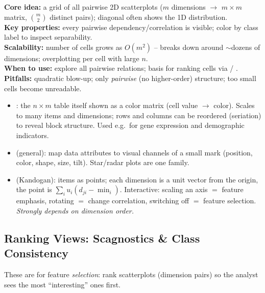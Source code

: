 \begin{algobox}
\textbf{Core idea:} a grid of all pairwise 2D scatterplots ($m$ dimensions $\to$
$m\times m$ matrix, $\binom{m}{2}$ distinct pairs); diagonal often shows the 1D
distribution.\\
\textbf{Key properties:} every pairwise dependency/correlation is visible; color
by class label to inspect separability.\\
\textbf{Scalability:} number of cells grows as $O(m^2)$ -- breaks down around
$\sim$dozens of dimensions; overplotting per cell with large $n$.\\
\textbf{When to use:} explore all pairwise relations; basis for ranking cells via
 / .\\
\textbf{Pitfalls:} quadratic blow-up; only \emph{pairwise} (no higher-order)
structure; too small cells become unreadable.
\end{algobox}

\begin{keybox}
\begin{itemize}
\item {}: the $n\times m$ table itself shown as a color
      matrix (cell value $\to$ color). Scales to many items and dimensions; rows
      and columns can be reordered (seriation) to reveal block structure. Used
      e.g.\ for gene expression and demographic indicators.
\item {} (general): map data attributes to visual channels of a small
      mark (position, color, shape, size, tilt). Star/radar plots are one family.
\item {} (Kandogan): items as points; each dimension is a
      unit vector from the origin, the point is $\sum_i u_i (d_{ji}-\min_i)$.
      Interactive: scaling an axis $=$ feature emphasis, rotating $=$ change
      correlation, switching off $=$ feature selection. \emph{Strongly depends on
      dimension order.}
\end{itemize}
\end{keybox}

\subsection{Ranking Views: Scagnostics \& Class Consistency}

These are  for feature \emph{selection}: rank scatterplots
(dimension pairs) so the analyst sees the most ``interesting'' ones first.

